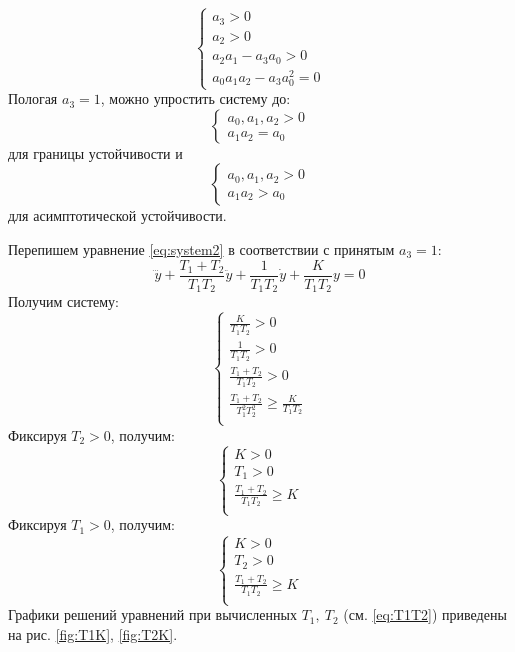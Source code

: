 \begin{equation}
    \begin{cases}
        a_3 > 0 \\ 
        a_2 > 0 \\   
        a_2a_1 - a_3a_0 > 0 \\
        a_0a_1a_2 - a_3a_0^2 = 0
    \end{cases}
\end{equation}
Пологая $a_3 = 1$, можно упростить систему до: 
\begin{equation}
    \begin{cases}
        a_0, a_1, a_2 > 0 \\ 
        a_1a_2 = a_0
    \end{cases}
\end{equation}
для границы устойчивости и 
\begin{equation}
    \begin{cases}
        a_0, a_1, a_2 > 0 \\ 
        a_1a_2 > a_0
    \end{cases}
\end{equation}
для асимптотической устойчивости.

Перепишем уравнение \ref{eq:system2} в соответствии с принятым $a_3 = 1$:
\begin{equation}
    \dddot{y} + \frac{T_1 + T_2}{T_1T_2} \ddot{y} + \frac{1}{T_1T_2} \dot{y} + \frac{K}{T_1T_2}y = 0
\end{equation} 
Получим систему:
\begin{equation}
    \begin{cases}
        \frac{K}{T_1T_2} > 0 \\
        \frac{1}{T_1T_2} > 0 \\ 
        \frac{T_1 + T_2}{T_1T_2} > 0 \\ 
        \frac{T_1 + T_2}{T_1^2T_2^2} \ge \frac{K}{T_1T_2} \\ 
    \end{cases}
\end{equation}
Фиксируя $T_2 > 0$, получим: 
\begin{equation}
    \begin{cases}
        K > 0 \\
        T_1 > 0 \\ 
        \frac{T_1 + T_2}{T_1T_2} \ge K \\ 
    \end{cases}
\end{equation}
Фиксируя $T_1 > 0$, получим: 
\begin{equation}
    \begin{cases}
        K > 0 \\
        T_2 > 0 \\  
        \frac{T_1 + T_2}{T_1T_2} \ge K \\ 
    \end{cases}
\end{equation}
Графики решений уравнений при вычисленных $T_1,~T_2$ (см. \ref{eq:T1T2}) приведены на рис. \ref{fig:T1K}, \ref{fig:T2K}.

